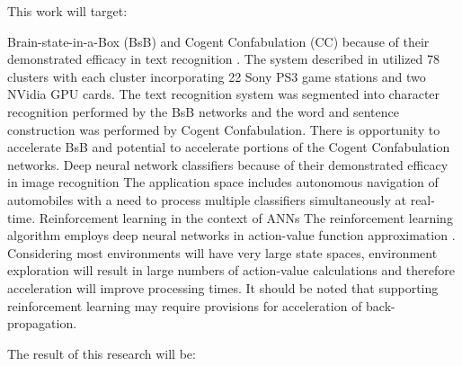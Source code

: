 \vspace{-2mm}
This work will target:
\begin{outline}
\renewcommand{\outlinei}{enumerate}
  \vspace{-3mm}
  \1 Brain-state-in-a-Box (BsB) and Cogent Confabulation (CC) because of their demonstrated efficacy in text recognition \cite{qiu2013parallel}.
    \vspace{-3mm}
    \2 The system described in \cite{qiu2013parallel} utilized 78 clusters with each cluster incorporating 22 Sony PS3 game stations and two NVidia GPU
       cards. The text recognition system was segmented into character recognition performed by the BsB networks and the word and sentence construction was
       performed by Cogent Confabulation.
       There is opportunity to accelerate BsB and potential to accelerate portions of the Cogent Confabulation networks.
  \vspace{-08mm}
  \1 Deep neural network classifiers \cite{krizhevsky2012imagenet} because of their demonstrated efficacy in image recognition 
    \vspace{-3mm}
    \2 The application space includes autonomous navigation of automobiles \cite{bojarski2016end}
       with a need to process multiple classifiers simultaneously at real-time.
  \vspace{-3mm}
  \1 Reinforcement learning in the context of ANNs
    \vspace{-3mm}
    \2 The reinforcement learning algorithm employs deep neural networks in action-value function approximation \cite{mnih2013playing}. 
       Considering most environments will have very large state spaces,
       environment exploration will result in large numbers of action-value calculations and therefore acceleration will improve processing times.
       It should be noted that supporting reinforcement learning may require provisions for acceleration of back-propagation.
\end{outline}
 The result of this research will be:
\vspace{-0.5mm}
